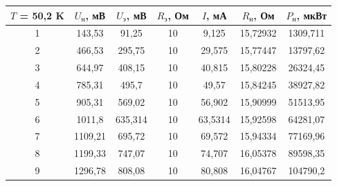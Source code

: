 \documentclass[a4paper, 12pt]{article} %
\begin{document}
\begin{center}
\begin{tabular}{|c|c|c|c|c|c|c|}
\hline
\textbf{$T$ = 50,2 K} & $U_\text{н}$, мВ & $U_\text{э}$, мВ & $R_\text{э}$, Ом & $I$, мА & $R_\text{н}$, Ом & $P_\text{н}$, мкВт \\ \hline
1                     & 143,53           & 91,25           & 10               & 9,125   & 15,72932         & 1309,711         \\ \hline
2                     & 466,53           & 295,75          & 10               & 29,575  & 15,77447         & 13797,62         \\ \hline
3                     & 644,97           & 408,15          & 10               & 40,815  & 15,80228         & 26324,45         \\ \hline
4                     & 785,31           & 495,7           & 10               & 49,57   & 15,84245         & 38927,82         \\ \hline
5                     & 905,31           & 569,02          & 10               & 56,902  & 15,90999         & 51513,95         \\ \hline
6                     & 1011,8           & 635,314         & 10               & 63,5314 & 15,92598         & 64281,07         \\ \hline
7                     & 1109,21          & 695,72          & 10               & 69,572  & 15,94334         & 77169,96         \\ \hline
8                     & 1199,33          & 747,07          & 10               & 74,707  & 16,05378         & 89598,35         \\ \hline
9                     & 1296,78          & 808,08          & 10               & 80,808  & 16,04767         & 104790,2         \\ \hline
\end{tabular}
\end{center}
\end{document}

